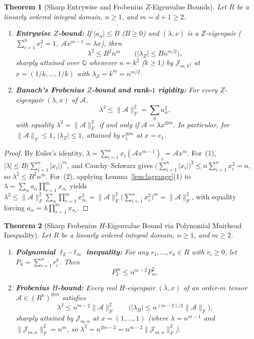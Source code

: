 \documentclass[11pt]{article}
\newtheorem{theorem}{Theorem}[section]
\theoremstyle{definition}
\newcommand{\Q}{\mathbb{Q}}
\newcommand{\cA}{\mathcal{A}}
\newcommand{\cJ}{\mathcal{J}}
\begin{document}
\begin{theorem}[Sharp Entrywise and Frobenius $Z$-Eigenvalue Bounds]\label{thm:Z-bounds}
Let $R$ be a linearly ordered integral domain, $n \ge 1$, and $m = d + 1 \ge 2$.
\begin{enumerate}
  \item \textbf{Entrywise $Z$-bound:} If $|a_\alpha| \le B$ ($B \ge 0$) and $(\lambda, x)$ is a
  $Z$-eigenpair ($\sum_{i=1}^n x_i^2 = 1$, $\cA x^{m-1} = \lambda x$), then
  \[
    \lambda^2 \le B^2 n^m \qquad \bigl(|\lambda_Z| \le B n^{m/2}\bigr),
  \]
  sharply attained over $\Q$ whenever $n = k^2$ ($k \ge 1$) by $\cJ_{m, k^2}$ at
  $x = (1/k, \dots, 1/k)$ with $\lambda_Z = k^m = n^{m/2}$.
  \item \textbf{Banach's Frobenius $Z$-bound and rank-$1$ rigidity:} For every $Z$-eigenpair
  $(\lambda, x)$ of $\cA$,
  \[
    \lambda^2 \le \|\cA\|_F^2 = \sum_{\alpha} a_\alpha^2,
  \]
  with equality $\lambda^2 = \|\cA\|_F^2$ if and only if $\cA = \lambda x^{\otimes m}$. In
  particular, for $\|\cA\|_F \le 1$, $|\lambda_Z| \le 1$, attained by $e_1^{\otimes m}$ at $x = e_1$.
\end{enumerate}
\end{theorem}

\begin{proof}
By Euler's identity, $\lambda = \sum_{i=1}^n x_i (\cA x^{m-1})_i = \cA x^m$. For~(1),
$|\lambda| \le B \bigl(\sum_{i=1}^n |x_i|\bigr)^m$, and Cauchy--Schwarz gives
$\bigl(\sum_{i=1}^n |x_i|\bigr)^2 \le n \sum_{i=1}^n x_i^2 = n$, so $\lambda^2 \le B^2 n^m$.
For~(2), applying Lemma~\ref{lem:lagrange}(1) to $\lambda = \sum_\alpha a_\alpha \prod_{r=1}^m x_{\alpha_r}$
yields $\lambda^2 \le \|\cA\|_F^2 \sum_\alpha \prod_{r=1}^m x_{\alpha_r}^2 =
\|\cA\|_F^2 \bigl(\sum_{i=1}^n x_i^2\bigr)^m = \|\cA\|_F^2$, with equality forcing
$a_\alpha = \lambda \prod_{r=1}^m x_{\alpha_r}$.
\end{proof}

\begin{theorem}[Sharp Frobenius $H$-Eigenvalue Bound via Polynomial Muirhead Inequality]\label{thm:frob-H}
Let $R$ be a linearly ordered integral domain, $n \ge 1$, and $m \ge 2$.
\begin{enumerate}
  \item \textbf{Polynomial $\ell_2$--$\ell_m$ inequality:} For any $r_1, \dots, r_n \in R$ with
  $r_i \ge 0$, let $P_k = \sum_{i=1}^n r_i^k$. Then
  \[
    P_2^m \le n^{m-2} P_m^2.
  \]
  \item \textbf{Frobenius $H$-bound:} Every real $H$-eigenpair $(\lambda, x)$ of an order-$m$
  tensor $\cA \in (R^n)^{\otimes m}$ satisfies
  \[
    \lambda^2 \le n^{m-2} \|\cA\|_F^2 \qquad \bigl(|\lambda_H| \le n^{(m-2)/2} \|\cA\|_F\bigr),
  \]
  sharply attained by $\cJ_{m,n}$ at $x = (1, \dots, 1)$ (where $\lambda = n^{m-1}$ and
  $\|\cJ_{m,n}\|_F^2 = n^m$, so $\lambda^2 = n^{2m-2} = n^{m-2} \|\cJ_{m,n}\|_F^2$).
\end{enumerate}
\end{theorem}
\end{document}
